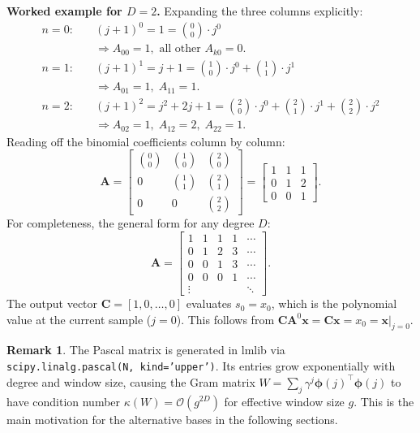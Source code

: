 \documentclass[11pt, a4paper]{article}
\theoremstyle{definition}
\newtheorem{remark}{Remark}
\newcommand{\vx}{\bm{x}}
\newcommand{\vC}{\bm{C}}
\newcommand{\mA}{\bm{A}}
\newcommand{\mphi}{\bm{\phi}}
\begin{document}
\medskip
\noindent\textbf{Worked example for $D=2$.}
Expanding the three columns explicitly:
\begin{align*}
  n=0: &\quad (j+1)^0 = 1 = \binom{0}{0}\cdot j^0 \\
       &\quad \Rightarrow A_{00}=1, \text{ all other } A_{k0}=0.\\[4pt]
  n=1: &\quad (j+1)^1 = j + 1 = \binom{1}{0}\cdot j^0 + \binom{1}{1}\cdot j^1 \\
       &\quad \Rightarrow A_{01}=1,\; A_{11}=1.\\[4pt]
  n=2: &\quad (j+1)^2 = j^2 + 2j + 1
               = \binom{2}{0}\cdot j^0 + \binom{2}{1}\cdot j^1 + \binom{2}{2}\cdot j^2 \\
       &\quad \Rightarrow A_{02}=1,\; A_{12}=2,\; A_{22}=1.
\end{align*}
Reading off the binomial coefficients column by column:
\[
  \mA = \begin{bmatrix}
    \binom{0}{0} & \binom{1}{0} & \binom{2}{0} \\
    0            & \binom{1}{1} & \binom{2}{1} \\
    0            & 0            & \binom{2}{2}
  \end{bmatrix}
  =
  \begin{bmatrix}
    1 & 1 & 1 \\
    0 & 1 & 2 \\
    0 & 0 & 1
  \end{bmatrix}.
\]
For completeness, the general form for any degree $D$:
\[
  \mA = \begin{bmatrix}
    1 & 1 & 1 & 1 & \cdots \\
    0 & 1 & 2 & 3 & \cdots \\
    0 & 0 & 1 & 3 & \cdots \\
    0 & 0 & 0 & 1 & \cdots \\
    \vdots & & & & \ddots
  \end{bmatrix}.
\]
The output vector $\vC = [1, 0, \ldots, 0]$ evaluates $s_0 = x_0$,
which is the polynomial value at the current sample ($j=0$).  This
follows from $\vC \mA^0 \vx = \vC \vx = x_0 = \vx|_{j=0}$.

\begin{remark}
The Pascal matrix is generated in lmlib via \texttt{scipy.linalg.pascal(N, kind='upper')}.
Its entries grow exponentially with degree and window size, causing the Gram
matrix $W = \sum_j \gamma^j \mphi(j)^\top \mphi(j)$ to have condition
number $\kappa(W) = \mathcal{O}(g^{2D})$ for effective window size $g$.
This is the main motivation for the alternative bases in the following
sections.
\end{remark}
\end{document}
